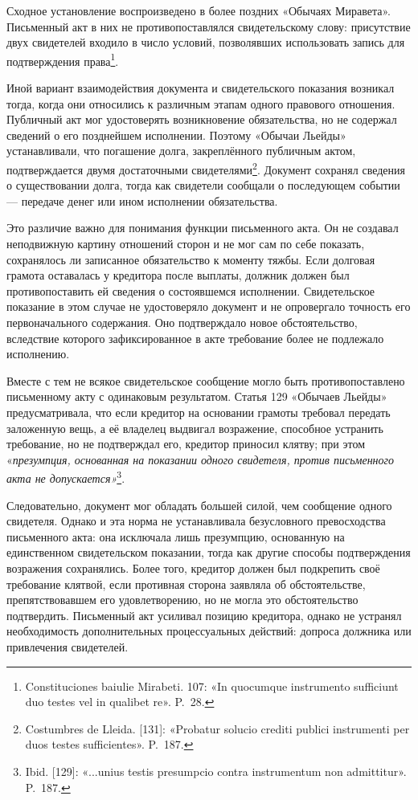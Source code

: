 Сходное установление воспроизведено в более поздних «Обычаях Миравета». Письменный акт в них не противопоставлялся свидетельскому слову: присутствие двух свидетелей входило в число условий, позволявших использовать запись для подтверждения права\footnote{Constituciones baiulie Mirabeti. 107: «In quocumque instrumento sufficiunt duo testes vel in qualibet re». P.~28.}.

Иной вариант взаимодействия документа и свидетельского показания возникал тогда, когда они относились к различным этапам одного правового отношения. Публичный акт мог удостоверять возникновение обязательства, но не содержал сведений о его позднейшем исполнении. Поэтому «Обычаи Льейды» устанавливали, что погашение долга, закреплённого публичным актом, подтверждается двумя достаточными свидетелями\footnote{Costumbres de Lleida. [131]: «Probatur solucio crediti publici instrumenti per duos testes sufficientes». P.~187.}. Документ сохранял сведения о существовании долга, тогда как свидетели сообщали о последующем событии --- передаче денег или ином исполнении обязательства.

Это различие важно для понимания функции письменного акта. Он не создавал неподвижную картину отношений сторон и не мог сам по себе показать, сохранялось ли записанное обязательство к моменту тяжбы. Если долговая грамота оставалась у кредитора после выплаты, должник должен был противопоставить ей сведения о состоявшемся исполнении. Свидетельское показание в этом случае не удостоверяло документ и не опровергало точность его первоначального содержания. Оно подтверждало новое обстоятельство, вследствие которого зафиксированное в акте требование более не подлежало исполнению.

Вместе с тем не всякое свидетельское сообщение могло быть противопоставлено письменному акту с одинаковым результатом. Статья 129 «Обычаев Льейды» предусматривала, что если кредитор на основании грамоты требовал передать заложенную вещь, а её владелец выдвигал возражение, способное устранить требование, но не подтверждал его, кредитор приносил клятву; при этом «\emph{презумпция, основанная на показании одного свидетеля, против письменного акта не допускается»}\footnote{Ibid. [129]: «...unius testis presumpcio contra instrumentum non admittitur». P.~187.}.

Следовательно, документ мог обладать большей силой, чем сообщение одного свидетеля. Однако и эта норма не устанавливала безусловного превосходства письменного акта: она исключала лишь презумпцию, основанную на единственном свидетельском показании, тогда как другие способы подтверждения возражения сохранялись. Более того, кредитор должен был подкрепить своё требование клятвой, если противная сторона заявляла об обстоятельстве, препятствовавшем его удовлетворению, но не могла это обстоятельство подтвердить. Письменный акт усиливал позицию кредитора, однако не устранял необходимость дополнительных процессуальных действий: допроса должника или привлечения свидетелей.

